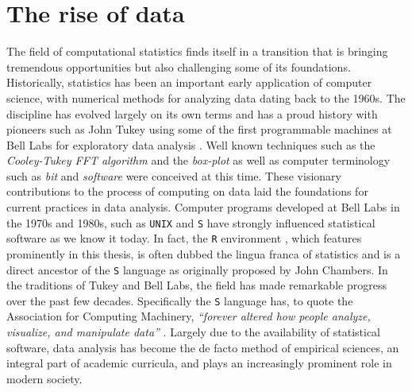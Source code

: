 

\section{The rise of data}

The field of computational statistics finds itself in a transition that is bringing tremendous opportunities but also challenging some of its foundations. Historically, statistics has been an important early application of computer science, with numerical methods for analyzing data dating back to the 1960s. The discipline has evolved largely on its own terms and has a proud history with pioneers such as John Tukey using some of the first programmable machines at Bell Labs for exploratory data analysis \citep{brillinger2002john}. Well known techniques such as the \emph{Cooley-Tukey FFT algorithm} \citep{cooley1965algorithm} and the \emph{box-plot} \citep{tukey1977exploratory} as well as computer terminology such as \emph{bit} and \emph{software} were conceived at this time. These visionary contributions to the process of computing on data laid the foundations for current practices in data analysis. Computer programs developed at Bell Labs in the 1970s and 1980s, such as \texttt{UNIX} \citep{ritchie1974unix} and \texttt{S} \citep{becker1984s, becker1988new} have strongly influenced statistical software as we know it today. In fact, the \texttt{R} environment \citep{R}, which features prominently in this thesis, is often dubbed the lingua franca of statistics and is a direct ancestor of the \texttt{S} language as originally proposed by John Chambers. In the traditions of Tukey and Bell Labs, the field has made remarkable progress over the past few decades. Specifically the \texttt{S} language has, to quote the Association for Computing Machinery, \emph{``forever altered how people analyze, visualize, and manipulate data''} \citep{chambersaward}. Largely due to the availability of statistical software, data analysis has become the de facto method of empirical sciences, an integral part of academic curricula, and plays an increasingly prominent role in modern society.


